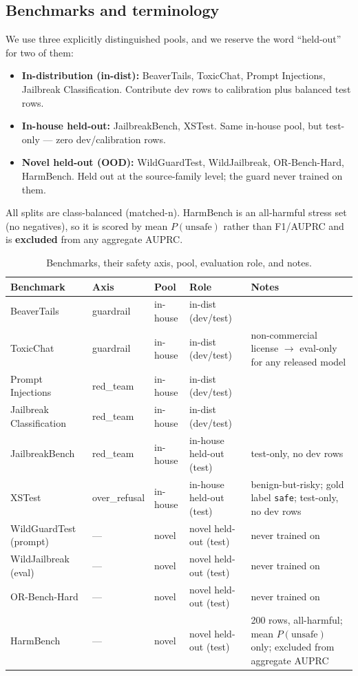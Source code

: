 \documentclass[sigconf,nonacm]{acmart}
\begin{document}
\subsection{Benchmarks and terminology}

We use three explicitly distinguished pools, and we reserve the word ``held-out'' for two of them:

\begin{itemize}
  \item \textbf{In-distribution (in-dist):} BeaverTails, ToxicChat, Prompt Injections, Jailbreak Classification. Contribute dev rows to calibration plus balanced test rows.
  \item \textbf{In-house held-out:} JailbreakBench, XSTest. Same in-house pool, but test-only --- zero dev/calibration rows.
  \item \textbf{Novel held-out (OOD):} WildGuardTest, WildJailbreak, OR-Bench-Hard, HarmBench. Held out at the source-family level; the guard never trained on them.
\end{itemize}

All splits are class-balanced (matched-n). HarmBench is an all-harmful stress set (no negatives), so it is scored by mean $P(\text{unsafe})$ rather than F1/AUPRC and is \textbf{excluded} from any aggregate AUPRC.

\begin{table}[t]
\centering
\small
\caption{Benchmarks, their safety axis, pool, evaluation role, and notes.}
\label{tab:benchmarks}
\begin{tabular}{lllll}
\toprule
Benchmark & Axis & Pool & Role & Notes \\
\midrule
BeaverTails & guardrail & in-house & in-dist (dev/test) & \\
ToxicChat & guardrail & in-house & in-dist (dev/test) & non-commercial license $\to$ eval-only for any released model \\
Prompt Injections & red\_team & in-house & in-dist (dev/test) & \\
Jailbreak Classification & red\_team & in-house & in-dist (dev/test) & \\
JailbreakBench & red\_team & in-house & in-house held-out (test) & test-only, no dev rows \\
XSTest & over\_refusal & in-house & in-house held-out (test) & benign-but-risky; gold label \texttt{safe}; test-only, no dev rows \\
WildGuardTest (prompt) & --- & novel & novel held-out (test) & never trained on \\
WildJailbreak (eval) & --- & novel & novel held-out (test) & never trained on \\
OR-Bench-Hard & --- & novel & novel held-out (test) & never trained on \\
HarmBench & --- & novel & novel held-out (test) & 200 rows, all-harmful; mean $P(\text{unsafe})$ only; excluded from aggregate AUPRC \\
\bottomrule
\end{tabular}
\end{table}
\end{document}

